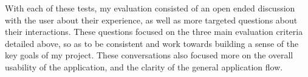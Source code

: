 \documentclass[10pt,twocolumn]{article}
\begin{document}
With each of these tests, my evaluation consisted of an open ended discussion with the user about their experience, as 
well as more targeted questions about their interactions. These questions focused on the three main evaluation criteria 
detailed above, so as to be consistent and work towards building a sense of the key goals of my project. These 
conversations also focused more on the overall usability of the application, and the clarity of the general application 
flow.




\end{document}
